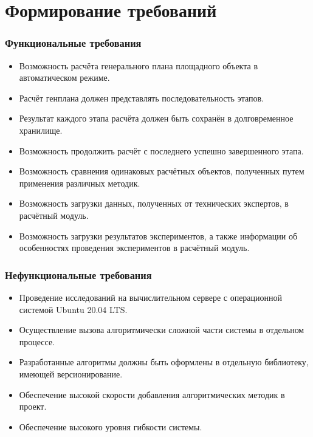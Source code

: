 \section{Формирование требований}

\begin{frame}
\frametitle{Функциональные требования}
\begin{itemize}
    \item {
        Возможность расчёта генерального плана площадного объекта в автоматическом режиме.
    }
    \item {
        Расчёт генплана должен представлять последовательность этапов.
    }
    \item {
        Результат каждого этапа расчёта должен быть сохранён в долговременное хранилище.
    }
    \item {
        Возможность продолжить расчёт с последнего успешно завершенного этапа.
    }
    \item {
        Возможность сравнения одинаковых расчётных объектов, полученных путем применения различных методик.
    }
    \item {
        Возможность загрузки данных, полученных от технических экспертов, в расчётный модуль.
    }
    \item {
        Возможность загрузки результатов экспериментов, а также информации об особенностях
        проведения экспериментов в расчётный модуль.
    }
\end{itemize}
\end{frame}


\begin{frame}
\frametitle{Нефункциональные требования}
\begin{itemize}
    \item {
        Проведение исследований на вычислительном сервере с операционной системой Ubuntu 20.04 LTS.
    }
    \item {
        Осуществление вызова алгоритмически сложной части системы в отдельном процессе.
    }
    \item {
        Разработанные алгоритмы должны быть оформлены в отдельную библиотеку, имеющей версионирование.
    }
    \item {
        Обеспечение высокой скорости добавления алгоритмических методик в проект.
    }
    \item {
        Обеспечение высокого уровня гибкости системы.
    }

\end{itemize}
\end{frame}